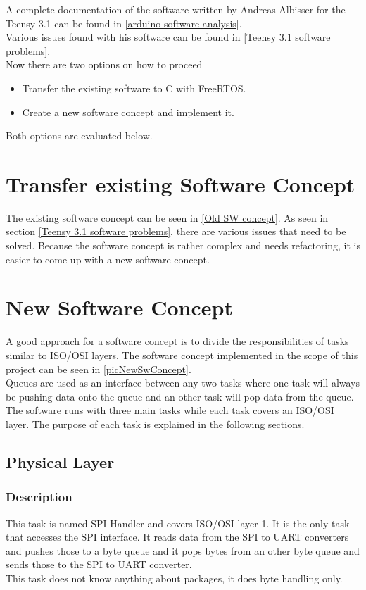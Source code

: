 %
A complete documentation of the software written by Andreas Albisser for the Teensy 3.1 can be found in \ref{arduino software analysis}.\\
Various issues found with his software can be found in \ref{Teensy 3.1 software problems}.\\
Now there are two options on how to proceed
\begin{itemize}
    \item Transfer the existing software to C with FreeRTOS.
    \item Create a new software concept and implement it.
\end{itemize}
Both options are evaluated below.
%
%
\section{Transfer existing Software Concept}
The existing software concept can be seen in \autoref{Old SW concept}. As seen in section \ref{Teensy 3.1 software problems}, there are various issues that need to be solved. Because the software concept is rather complex and needs refactoring, it is easier to come up with a new software concept.
%
\section{New Software Concept}%
%
%
A good approach for a software concept is to divide the responsibilities of tasks similar to ISO/OSI layers. 
The software concept implemented in the scope of this project can be seen in \autoref{picNewSwConcept}.\\
Queues are used as an interface between any two tasks where one task will always be pushing data onto the queue and an other task will pop data from the queue.\\
The software runs with three main tasks while each task covers an ISO/OSI layer. The purpose of each task is explained in the following sections.
%
%
\subsection{Physical Layer}
\subsubsection{Description}
This task is named SPI Handler and covers ISO/OSI layer 1. It is the only task that accesses the SPI interface. It reads data from the SPI to UART converters and pushes those to a byte queue and it pops bytes from an other byte queue and sends those to the SPI to UART converter.\\
This task does not know anything about packages, it does byte handling only.
